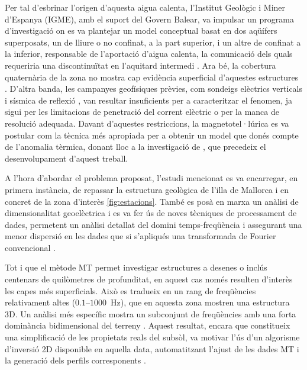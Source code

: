 \documentclass[11pt,a4paper,oneside]{article}
\begin{document}
\clearpage

Per tal d'esbrinar l'origen d'aquesta aigua calenta, l'Institut Geològic i Miner d'Espanya (IGME), amb el suport del Govern Balear, va impulsar un programa d'investigació on es va plantejar un model conceptual basat en dos aqüífers superposats, un de lliure o no confinat, a la part superior, i un altre de confinat a la inferior, responsable de l'aportació d'aigua calenta, la comunicació dels quals requeriria una discontinuïtat en l'aquitard intermedi \citep{igme2003}. Ara bé, la cobertura quaternària de la zona no mostra cap evidència superficial d'aquestes estructures \citep{arango2005}. D’altra banda, les campanyes geofísiques prèvies, com sondeigs elèctrics verticals \citep{igme1985} i sísmica de reflexió \citep{benedicto1993}, van resultar insuficients per a caracteritzar el fenomen, ja sigui per les limitacions de penetració del corrent elèctric o per la manca de resolució adequada. Davant d'aquestes restriccions, la magnetotel·lúrica es va postular com la tècnica més apropiada per a obtenir un model que donés compte de l'anomalia tèrmica, donant lloc a la investigació de \citet{arango2005}, que precedeix el desenvolupament d’aquest treball.

\vspace{5pt}

A l’hora d’abordar el problema proposat, l’estudi mencionat es va encarregar, en primera instància, de repassar la estructura geològica de l’illa de Mallorca i en concret de la zona d'interès \cref{fig:estacions}. També es posà en marxa un anàlisi de dimensionalitat geoelèctrica \citep{weaver2000,marti2004} i es va fer ús de noves tècniques de processament de dades, permetent un anàlisi detallat del domini temps-freqüència i assegurant una menor dispersió en les dades que si s'apliqués una transformada de Fourier convencional \citep{arango2005}.

\vspace{5pt}

Tot i que el mètode MT permet investigar estructures a desenes o inclús centenars de quilòmetres de profunditat, en aquest cas només resulten d’interès les capes més superficials. Això es tradueix en un rang de freqüències relativament altes ($0.1$--$1000$~Hz), que en aquesta zona mostren una estructura 3D. Un anàlisi més específic mostra un subconjunt de freqüències amb una forta dominància bidimensional del terreny \citep{arango2005}. Aquest resultat, encara que constitueix una simplificació de les propietats reals del subsòl, va motivar l'ús d'un algorisme d'inversió 2D disponible en aquella data, automatitzant l'ajust de les dades MT i la generació dels perfils corresponents \citep{siripunvaraporn2000,pedersen2005}. 
\end{document}
